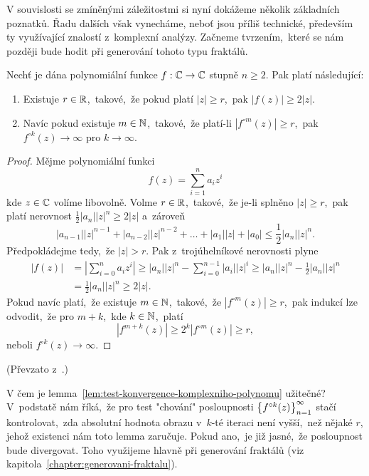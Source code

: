 V souvislosti se zmíněnými záležitostmi si nyní dokážeme několik základních poznatků. Řadu dalších však vynecháme, neboť jsou příliš technické, především ty využívající znalostí z~komplexní analýzy. Začneme tvrzením,~které se nám později bude hodit při generování tohoto typu fraktálů.
\begin{lemma}\label{lem:test-konvergence-komplexniho-polynomu}
    Nechť je dána polynomiální funkce $f:\mathbb{C} \rightarrow \mathbb{C}$ stupně $n\geqslant 2$. Pak platí následující:
    \begin{enumerate}[label=(\roman*)]
        \item Existuje $r\in\mathbb{R}$,~takové,~že pokud platí $|z|\geqslant r$,~pak $|f(z)|\geqslant2|z|$.
        \item Navíc pokud existuje $m\in\mathbb{N}$,~takové,~že platí-li $|f^{\circ m}(z)|\geqslant r$,~pak $f^{\circ k}(z)\to\infty$ pro $k\to\infty$.
    \end{enumerate} 
\end{lemma}
\begin{proof}
    Mějme polynomiální funkci
    \[f(z)=\sum_{i=1}^{n}a_iz^i\]
    kde $z\in\mathbb{C}$ volíme libovolně. Volme $r\in\mathbb{R}$,~takové,~že je-li splněno $|z|\geqslant r$,~pak platí nerovnost $\frac{1}{2}|a_n||z|^n\geqslant 2|z|$ a~zároveň
    \[|a_{n-1}||z|^{n-1}+|a_{n-2}||z|^{n-2}+\dots+|a_1||z|+|a_0|\leqslant\frac{1}{2}|a_n||z|^n.\]
    Předpokládejme tedy,~že $|z|>r$. Pak z~trojúhelníkové nerovnosti plyne
    \begin{align*}
        |f(z)|&=\left|\sum_{i=0}^{n}a_iz^i\right|\geqslant|a_n||z|^n-\sum_{i=0}^{n-1}|a_i||z|^i\geqslant|a_n||z|^n-\frac{1}{2}|a_n||z|^n\\
        &=\frac{1}{2}|a_n||z|^n\geqslant2|z|.
    \end{align*}
    Pokud navíc platí,~že existuje $m\in\mathbb{N}$,~takové,~že $|f^{\circ m}(z)|\geqslant r$,~pak indukcí lze odvodit,~že pro $m+k$,~kde $k\in\mathbb{N}$,~platí
    \[|f^{m+k}(z)|\geqslant2^k|f^{\circ m}(z)|\geqslant r,\]
    neboli $f^{\circ k}(z)\to\infty$.
\end{proof}
(Převzato z~\cite[str. 237]{Falconer1989}.)

V čem je lemma~\ref{lem:test-konvergence-komplexniho-polynomu} užitečné? V~podstatě nám říká,~že pro test "chování" posloupnosti $\left\{f^{\circ k}(z)\right\}_{n=1}^\infty$ stačí kontrolovat,~zda absolutní hodnota obrazu v~$k$-té iteraci není vyšší,~než nějaké $r$, jehož existenci nám toto lemma zaručuje. Pokud ano,~je již jasné,~že posloupnost bude divergovat. Toho využijeme hlavně při generování fraktálů (viz kapitola~\ref{chapter:generovani-fraktalu}).

